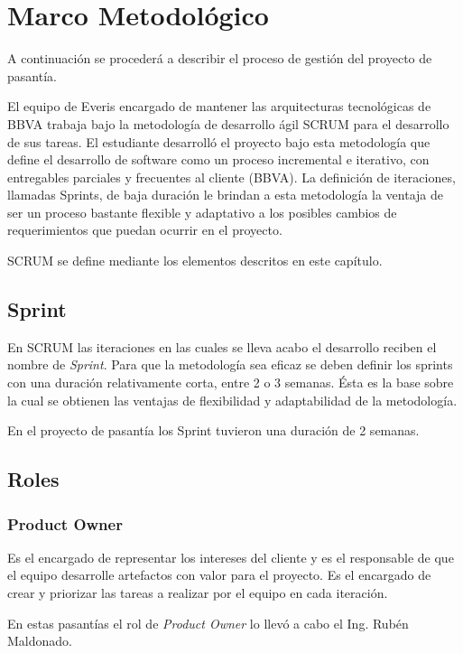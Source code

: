 \chapter{Marco Metodológico}
\label{capitulo4}

A continuación se procederá a describir el proceso de gestión
del proyecto de pasantía.

El equipo de Everis encargado de mantener las arquitecturas tecnológicas
de BBVA trabaja bajo la metodología de desarrollo ágil SCRUM para el
desarrollo de sus tareas. El estudiante desarrolló el proyecto bajo
esta metodología que define el desarrollo de software como un proceso
incremental e iterativo, con entregables parciales y frecuentes al
cliente (BBVA). La definición de iteraciones, llamadas Sprints, de baja duración
le brindan a esta metodología la ventaja de ser un proceso bastante flexible y
adaptativo a los posibles cambios de requerimientos que puedan ocurrir en el proyecto.

SCRUM se define mediante los elementos descritos en este capítulo.

\section{Sprint}
En SCRUM las iteraciones en las cuales se lleva acabo el desarrollo reciben el nombre
de \emph{Sprint}. Para que la metodología sea eficaz se deben definir los sprints con
una duración relativamente corta, entre 2 o 3 semanas. Ésta es la base sobre la cual
se obtienen las ventajas de flexibilidad y adaptabilidad de la metodología.

En el proyecto de pasantía los Sprint tuvieron una duración de 2 semanas.

\section{Roles}

\subsection{Product Owner}
Es el encargado de representar los intereses del cliente y es el responsable de
que el equipo desarrolle artefactos con valor para el proyecto. Es el encargado
de crear y priorizar las tareas a realizar por el equipo en cada iteración.

En estas pasantías el rol de \emph{Product Owner} lo llevó a cabo el Ing. Rubén
Maldonado.


